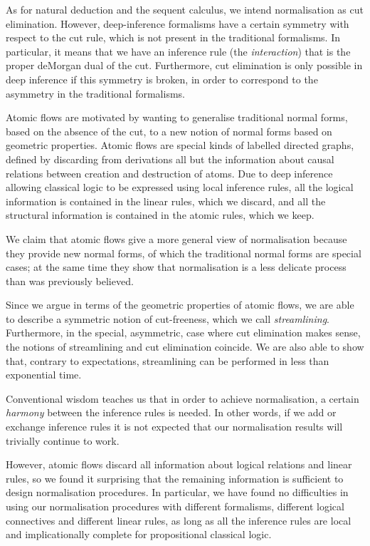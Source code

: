 As for natural deduction and the sequent calculus, we intend normalisation as cut elimination. However, deep-inference formalisms have a certain symmetry with respect to the cut rule, which is not present in the traditional formalisms. In particular, it means that we have an inference rule (the \emph{interaction}) that is the proper deMorgan dual of the cut. Furthermore, cut elimination is only possible in deep inference if this symmetry is broken, in order to correspond to the asymmetry in the traditional formalisms.

Atomic flows are motivated by wanting to generalise traditional normal forms, based on the absence of the cut, to a new notion of normal forms based on geometric properties. Atomic flows are special kinds of labelled directed graphs, defined by discarding from derivations all but the information about causal relations between creation and destruction of atoms. Due to deep inference allowing classical logic to be expressed using local inference rules, all the logical information is contained in the linear rules, which we discard, and all the structural information is contained in the atomic rules, which we keep.

We claim that atomic flows give a more general view of normalisation because they provide new normal forms, of which the traditional normal forms are special cases; at the same time they show that normalisation is a less delicate process than was previously believed.

Since we argue in terms of the geometric properties of atomic flows, we are able to describe a symmetric notion of cut-freeness, which we call \emph{streamlining}. Furthermore, in the special, asymmetric, case where cut elimination makes sense, the notions of streamlining and cut elimination coincide. We are also able to show that, contrary to expectations, streamlining can be performed in less than exponential time.

Conventional wisdom teaches us that in order to achieve normalisation, a certain \emph{harmony} between the inference rules is needed. In other words, if we add or exchange inference rules it is not expected that our normalisation results will trivially continue to work.

However, atomic flows discard all information about logical relations and linear rules, so we found it surprising that the remaining information is sufficient to design normalisation procedures. In particular, we have found no difficulties in using our normalisation procedures with different formalisms, different logical connectives and different linear rules, as long as all the inference rules are local and implicationally complete for propositional classical logic.

